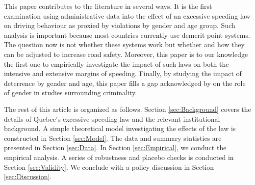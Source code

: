This paper contributes to the literature in several ways. 
It is the first examination using administrative data into the effect of 
an excessive speeding law on driving behaviour 
as proxied by violations by gender and age group. 
Such analysis is important because most countries currently use demerit point systems. 
The question now is not whether these systems work 
but whether and how they can be adjusted to increase road safety. 
Moreover, this paper is to our knowledge the first one to empirically investigate 
the impact of such laws on both the intensive and extensive margins of speeding. 
Finally, by studying the impact of deterrence by gender and age, 
this paper fills a gap acknowledged by 
\citet{freeman1999}
on the role of gender in studies surrounding criminality.

The rest of this article is organized as follows. 
Section \ref{sec:Background} covers the details of Quebec’s excessive speeding law 
and the relevant institutional background. 
A simple theoretical model investigating the effects of the law is constructed in Section \ref{sec:Model}. 
The data and summary statistics are presented in Section \ref{sec:Data}. 
In Section \ref{sec:Empirical}, we conduct the empirical analysis. 
A series of robustness and placebo checks is conducted in Section \ref{sec:Validity}. 
We conclude with a policy discussion in Section \ref{sec:Discussion}.

